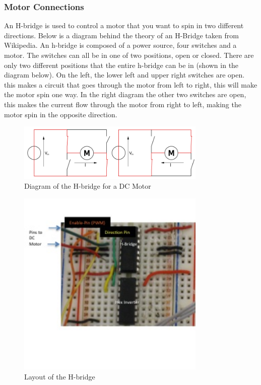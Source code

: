 \subsubsection{Motor Connections}
An H-bridge is used to  control a motor that you want to spin in two different directions. Below is a diagram behind the theory of an H-Bridge taken from Wikipedia. An h-bridge is composed of a power source, four switches and a motor. The switches can all be in one of two positions, open or closed. There are only two different positions that the entire h-bridge can be in (shown in the diagram below). On the left, the lower left and upper right switches are open. this makes a circuit that goes through the motor from left to right, this will make the motor spin one way.  In the right diagram the other two switches are open, this makes the current flow through the motor from right to left, making the motor spin in the opposite direction.
\begin{figure}[h]
  \begin{center}
    \includegraphics[width=90mm]{imageSources/hBridgeConnect1.png}
  \end{center}
  \caption{Diagram of the H-bridge for a DC Motor} 
  \label{hBridgeConnect1}
\end{figure}

\begin{figure}[h]
  \begin{center}
    \includegraphics[width=90mm]{imageSources/hBridgeConnect2.png}
  \end{center}
  \caption{Layout of the H-bridge} 
  \label{hBridgeConnect2}
\end{figure}

